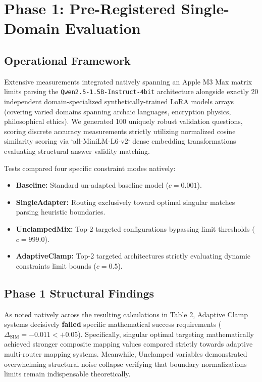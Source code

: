\documentclass[11pt]{article}
\begin{document}
\section{Phase 1: Pre-Registered Single-Domain Evaluation}

\subsection{Operational Framework}
Extensive measurements integrated natively spanning an Apple M3 Max matrix limits parsing the \texttt{Qwen2.5-1.5B-Instruct-4bit} architecture alongside exactly 20 independent domain-specialized synthetically-trained LoRA models arrays (covering varied domains spanning archaic languages, encryption physics, philosophical ethics). 
We generated 100 uniquely robust validation questions, scoring discrete accuracy measurements strictly utilizing normalized cosine similarity scoring via `all-MiniLM-L6-v2` dense embedding transformations evaluating structural answer validity matching. 

Tests compared four specific constraint modes natively:
\begin{itemize}
    \item \textbf{Baseline:} Standard un-adapted baseline model ($c = 0.001$).
    \item \textbf{SingleAdapter:} Routing exclusively toward optimal singular matches parsing heuristic boundaries.
    \item \textbf{UnclampedMix:} Top-2 targeted configurations bypassing limit thresholds ($c = 999.0$).
    \item \textbf{AdaptiveClamp:} Top-2 targeted architectures strictly evaluating dynamic constraints limit bounds ($c = 0.5$).
\end{itemize}

\subsection{Phase 1 Structural Findings}

As noted natively across the resulting calculations in Table 2, Adaptive Clamp systems decisively \textbf{failed} specific mathematical success requirements ($\Delta_{\text{SIM}} = -0.011 < +0.05$). Specifically, singular optimal targeting mathematically achieved stronger composite mapping values compared strictly towards adaptive multi-router mapping systems. Meanwhile, Unclamped variables demonstrated overwhelming structural noise collapse verifying that boundary normalizations limits remain indispensable theoretically.
\end{document}
